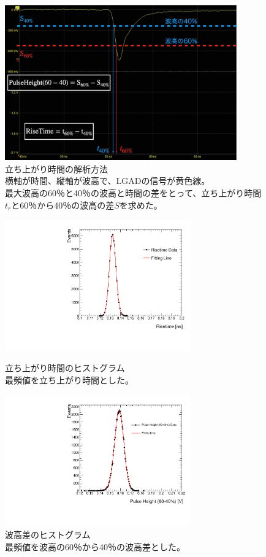 \begin{figure}[h]
    \centering
    \includegraphics[width=10cm]{fig/ch4/RiseTime_analysis.jpg}
    \caption[立ち上がり時間の解析方法]{立ち上がり時間の解析方法\\横軸が時間、縦軸が波高で、LGADの信号が黄色線。\\最大波高の60％と40％の波高と時間の差をとって、立ち上がり時間$t_r$と60％から40％の波高の差$S$を求めた。}
    \label{fg:RiseTime_analysis}
\end{figure}

\begin{figure}[h]
    \begin{minipage}[b]{0.5\linewidth}
        \centering
        \includegraphics[width=8cm]{fig/graph/Risetime_hist_APD.pdf}
        \caption[立ち上がり時間のヒストグラム]{立ち上がり時間のヒストグラム\\最頻値を立ち上がり時間とした。}
        \label{fg:Risetime_hist_APD}
    \end{minipage}
    \begin{minipage}[b]{0.5\linewidth}
        \centering
        \includegraphics[width=8cm]{fig/graph/PulseHeight_hist_60-40.pdf}
        \caption[波高差のヒストグラム]{波高差のヒストグラム\\最頻値を波高の60％から40％の波高差とした。}
        \label{fg:APD_Ph_60-40_vsBias}
    \end{minipage}
\end{figure}

